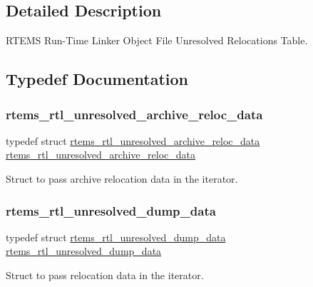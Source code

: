 \subsection{Detailed Description}
R\+T\+E\+MS Run-\/\+Time Linker Object File Unresolved Relocations Table. 



\subsection{Typedef Documentation}
\mbox{\label{rtl-unresolved_8c_aa5ce530d170a1f8b7a092a71413800a6}} 
\subsubsection{\texorpdfstring{rtems\_rtl\_unresolved\_archive\_reloc\_data}{rtems\_rtl\_unresolved\_archive\_reloc\_data}}
{\footnotesize\ttfamily typedef struct \mbox{\hyperlink{structrtems__rtl__unresolved__archive__reloc__data}{rtems\+\_\+rtl\+\_\+unresolved\+\_\+archive\+\_\+reloc\+\_\+data}}  \mbox{\hyperlink{structrtems__rtl__unresolved__archive__reloc__data}{rtems\+\_\+rtl\+\_\+unresolved\+\_\+archive\+\_\+reloc\+\_\+data}}}

Struct to pass archive relocation data in the iterator. \mbox{\label{rtl-unresolved_8c_a42b8775df426c03e56deaea007d584af}} 
\subsubsection{\texorpdfstring{rtems\_rtl\_unresolved\_dump\_data}{rtems\_rtl\_unresolved\_dump\_data}}
{\footnotesize\ttfamily typedef struct \mbox{\hyperlink{structrtems__rtl__unresolved__dump__data}{rtems\+\_\+rtl\+\_\+unresolved\+\_\+dump\+\_\+data}}  \mbox{\hyperlink{structrtems__rtl__unresolved__dump__data}{rtems\+\_\+rtl\+\_\+unresolved\+\_\+dump\+\_\+data}}}

Struct to pass relocation data in the iterator. \mbox{\label{rtl-unresolved_8c_a8009420221ec8092212e0c5d54a658e6}} 
